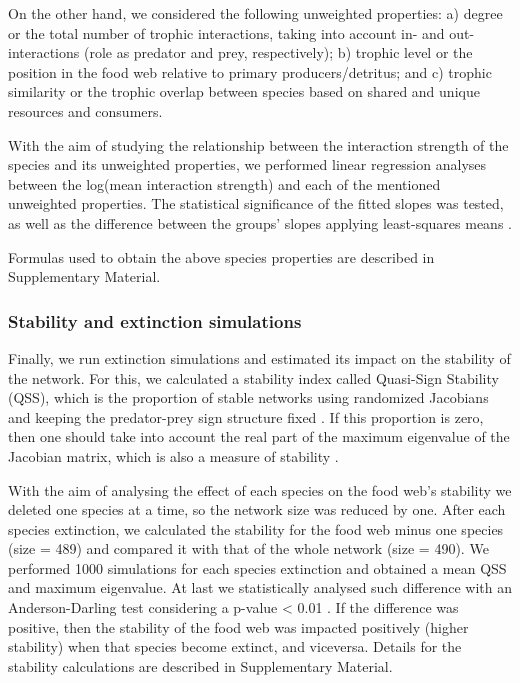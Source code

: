 \documentclass[gc, manuscript]{copernicus}
\begin{document}
On the other hand, we considered the following unweighted properties: a)
degree or the total number of trophic interactions, taking into account
in- and out-interactions (role as predator and prey, respectively); b)
trophic level or the position in the food web relative to primary
producers/detritus; and c) trophic similarity or the trophic overlap
between species based on shared and unique resources and consumers.

With the aim of studying the relationship between the interaction
strength of the species and its unweighted properties, we performed
linear regression analyses between the log(mean interaction strength)
and each of the mentioned unweighted properties. The statistical
significance of the fitted slopes was tested, as well as the difference
between the groups' slopes applying least-squares means
\citep{Harvey1960}.

Formulas used to obtain the above species properties are described in
Supplementary Material.

\subsubsection{Stability and extinction simulations}

Finally, we run extinction simulations and estimated its impact on the
stability of the network. For this, we calculated a stability index
called Quasi-Sign Stability (QSS), which is the proportion of stable
networks using randomized Jacobians and keeping the predator-prey sign
structure fixed \citep{Allesina2008}. If this proportion is zero, then
one should take into account the real part of the maximum eigenvalue of
the Jacobian matrix, which is also a measure of stability
\citep{Grilli2016}.

With the aim of analysing the effect of each species on the food web's
stability we deleted one species at a time, so the network size was
reduced by one. After each species extinction, we calculated the
stability for the food web minus one species (size = 489) and compared
it with that of the whole network (size = 490). We performed 1000
simulations for each species extinction and obtained a mean QSS and
maximum eigenvalue. At last we statistically analysed such difference
with an Anderson-Darling test considering a p-value \textless{} 0.01
\citep{Scholz1987}. If the difference was positive, then the stability
of the food web was impacted positively (higher stability) when that
species become extinct, and viceversa. Details for the stability
calculations are described in Supplementary Material.
\end{document}
